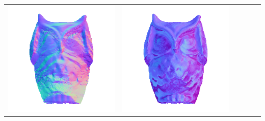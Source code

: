 \begin{tabularx}{\linewidth}{@{}Y@{}Y@{}Y@{}Y@{}Y@{}Y@{}}
\includegraphics[width=\linewidth]{semisynthetic/20160617_15_yu_out.png} &
\includegraphics[width=\linewidth]{semisynthetic/20160617_15_dpsn_out.png} &

\end{tabularx}
